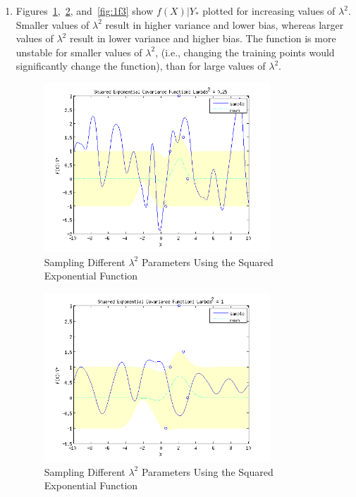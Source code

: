 \documentclass{article}
\begin{document}
\begin{enumerate}[label=(\alph*)]
\item Figures~\ref{fig:1f1},~\ref{fig:1f2}, and~\ref{fig:1f3} show $f(X)|Y_\ast$ plotted for increasing values of $\lambda^2$.
Smaller values of $\lambda^2$ result in higher variance and lower bias, whereas larger values
of $\lambda^2$ result in lower variance and higher bias. The function is more unstable for smaller values
of $\lambda^2$, (i.e., changing the training points would significantly change the function), 
than for large values of $\lambda^2$.


\begin{figure}[H]
\centering
\includegraphics[width=0.8\textwidth]{1_f_1.png}
\caption{Sampling Different $\lambda^2$ Parameters Using the Squared Exponential Function}
\label{fig:1f1}
\end{figure}

\begin{figure}[H]
\centering
\includegraphics[width=0.8\textwidth]{1_f_2.png}
\caption{Sampling Different $\lambda^2$ Parameters Using the Squared Exponential Function}
\label{fig:1f2}
\end{figure}


\end{enumerate}
\end{document}
